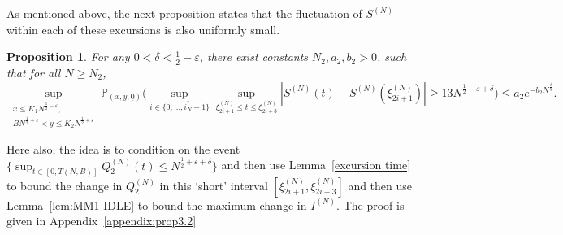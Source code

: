 \documentclass[11pt, reqno]{article}
\newtheorem{prop}[theorem]{Proposition}
\numberwithin{equation}{section}
\numberwithin{theorem}{section}
\newcommand\blue[1]{#1}
\begin{document}
As mentioned above, the next  proposition states that the fluctuation of $S^{(N)}$ within each of these excursions is also uniformly small.
\begin{prop}\label{prop:change-st}
For any $0<\delta<\frac{1}{2}-\varepsilon$, there exist constants $N_2, a_2, b_2>0$, such that for all $N\geq N_2$, 
$$\sup_{\substack{x\leq K_1N^{\frac{1}{2} - \varepsilon},\\ BN^{\frac{1}{2} + \varepsilon} <y\leq K_2N^{\frac{1}{2} + \varepsilon}}}\mathbb{P}_{(x,y, \underline{0})}\Big(\sup_{i\in \{0,...,i^*_N-1\}}\sup_{\xi^{(N)}_{2i+1}\leq t\leq \xi^{(N)}_{2i+3}}\left|S^{(N)}(t)-S^{(N)}(\xi^{(N)}_{2i+1})\right|\geq 13 N^{\frac{1}{2}-\varepsilon+\delta} \Big)\leq a_2 e^{-b_2 N^{\frac{\delta}{5}}}.$$
\end{prop}
Here also, the idea is to condition on the event $\{\sup_{t \in [0, T(N,B)]} Q^{(N)}_2(t)\leq N^{\frac{1}{2}+\varepsilon+\delta}\}$ and then use Lemma~\ref{excursion time} to bound the change in $Q^{(N)}_2$ in this `short' interval 
$[\xi^{(N)}_{2i+1}, \xi^{(N)}_{2i+3}]$ and then use 
Lemma~\ref{lem:MM1-IDLE} to bound the maximum change in $I^{(N)}$.
The proof is given in Appendix~\ref{appendix:prop3.2}
\end{document}
